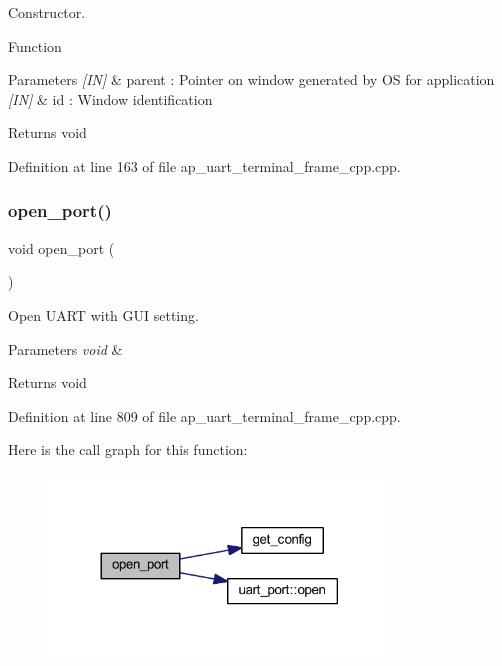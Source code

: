 Constructor. 

Function
\begin{DoxyParams}{Parameters}
{\em \mbox{[}\+I\+N\mbox{]}} & parent \+: Pointer on window generated by OS for application \\
\hline
{\em \mbox{[}\+I\+N\mbox{]}} & id \+: Window identification \\
\hline
\end{DoxyParams}
\begin{DoxyReturn}{Returns}
void 
\end{DoxyReturn}


Definition at line 163 of file ap\+\_\+uart\+\_\+terminal\+\_\+frame\+\_\+cpp.\+cpp.

\mbox{\label{group___u_a_r_t__terminal_gaeb58113a5a9df68000116b815e75ef76}} 
\subsubsection{open\_port()}
{\footnotesize\ttfamily void open\+\_\+port (\begin{DoxyParamCaption}\item[{void}]{ }\end{DoxyParamCaption})}



Open U\+A\+RT with G\+UI setting. 


\begin{DoxyParams}{Parameters}
{\em void} & \\
\hline
\end{DoxyParams}
\begin{DoxyReturn}{Returns}
void 
\end{DoxyReturn}


Definition at line 809 of file ap\+\_\+uart\+\_\+terminal\+\_\+frame\+\_\+cpp.\+cpp.

Here is the call graph for this function\+:
\nopagebreak
\begin{figure}[H]
\begin{center}
\leavevmode
\includegraphics[width=257pt]{group___u_a_r_t__terminal_gaeb58113a5a9df68000116b815e75ef76_cgraph}
\end{center}
\end{figure}
\mbox{\label{group___u_a_r_t__terminal_ga814ef6f49245db963f3faefc8ac98efb}} 
